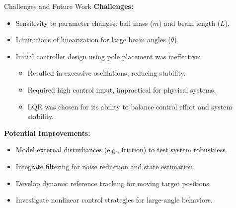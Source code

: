 \documentclass{beamer}
\begin{document}
\begin{frame}{Challenges and Future Work}
    \textbf{Challenges:}
    \begin{itemize}
        \item Sensitivity to parameter changes: ball mass (\(m\)) and beam length (\(L\)).
        \item Limitations of linearization for large beam angles (\(\theta\)).
        \item Initial controller design using pole placement was ineffective:
        \begin{itemize}
            \footnotesize
            \item Resulted in excessive oscillations, reducing stability.
            \item Required high control input, impractical for physical systems.
            \item LQR was chosen for its ability to balance control effort and system stability.
        \end{itemize}
    \end{itemize}

    \vspace{0.2cm}
    \textbf{Potential Improvements:}
    \begin{itemize}
        \item Model external disturbances (e.g., friction) to test system robustness.
        \item Integrate filtering for noise reduction and state estimation.
        \item Develop dynamic reference tracking for moving target positions.
        \item Investigate nonlinear control strategies for large-angle behaviors.
    \end{itemize}
\end{frame}
\end{document}
